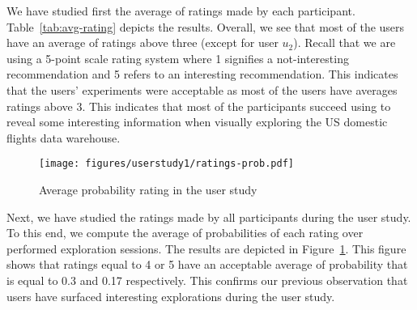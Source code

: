 We have studied first the average of ratings made by each participant. Table~\ref{tab:avg-rating} depicts the results.
Overall, we see that most of the users have an average of ratings above three (except for user $u_2$). Recall that we are using a 5-point scale rating system where 1 signifies a not-interesting recommendation and 5 refers to an interesting recommendation. This indicates that the users' experiments were acceptable as most of the users have averages ratings above 3. This indicates that most of the participants succeed using \prototypeOne{} to reveal some interesting information when visually exploring the US domestic flights data warehouse.

	
	
\begin{figure}[b]
\centering
\texttt{[image: figures/userstudy1/ratings-prob.pdf]}
		\caption{Average probability rating in the user study}
		\label{fig:prob-rating}
	\end{figure}

Next, we have studied the ratings made by all participants during the user study. 
To this end, we compute the average of probabilities of each rating over performed exploration sessions. The results are depicted in Figure~\ref{fig:prob-rating}. This figure shows that ratings equal to 4 or 5 have an acceptable average of probability that is equal to 0.3 and 0.17 respectively.	This confirms our previous observation that users have surfaced interesting explorations during the user study.


	

